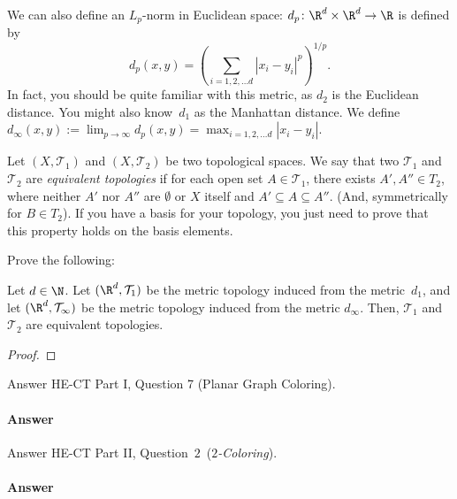 \documentclass{article}
\begin{document}
\nextprob{}

We can also define an $L_p$-norm in Euclidean space:
$d_p \colon \R^d \times \R^d \to \R$ is defined by
$$d_p (x,y) = \left( \sum_{i=1,2, \ldots d} |x_i-y_i|^p \right)^{1/p}.$$
In fact, you should be quite familiar with this metric,
as $d_2$ is the Euclidean distance.  You might also know~$d_1$ as the
Manhattan distance.  We define $d_{\infty}(x,y) := \lim_{p \to \infty} d_p(x,y)
= \max_{i=1,2, \ldots d} |x_i - y_i|$.

Let $(X,\mathcal{T}_1)$ and $(X,\mathcal{T}_2)$ be two topological spaces.
We say that two $\mathcal{T}_1$ and $\mathcal{T}_2$ are \emph{equivalent topologies} if for each open set $A \in \mathcal{T}_1$,
there exists $A',A'' \in T_2$, where neither $A'$ nor $A''$ are $\emptyset$ or $X$
itself and $A' \subseteq A \subseteq A''$.  (And, symmetrically for $B \in
T_2$).  If you have a basis for your topology, you just need to prove that this
property holds on the basis elements.

Prove the following:

\begin{theorem}
    Let $d \in \N$.  Let $(\R^d,\mathcal{T}_1)$ be the metric topology induced from the
    metric~$d_1$, and let $(\R^d,\mathcal{T}_{\infty})$ be the metric topology induced from the
    metric $d_{\infty}$.
   Then, $\mathcal{T}_1$ and $\mathcal{T}_2$ are equivalent topologies.
\end{theorem}

\begin{proof}

    \todo{}

\end{proof}


Answer HE-CT Part I, Question 7 (Planar Graph Coloring).

\paragraph{Answer}

Answer HE-CT Part II, Question~$2$~(\emph{$2$-Coloring}).

\paragraph{Answer}
\end{document}
